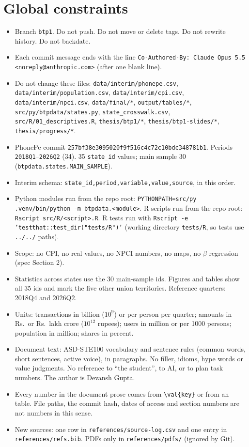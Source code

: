 \documentclass[10pt,a4paper]{article}
\newcommand{\f}[1]{\texttt{#1}}
\begin{document}
\section*{Global constraints}
\begin{itemize}
\item Branch \f{btp1}. Do not push. Do not move or delete tags. Do not rewrite history. Do not backdate.
\item Each commit message ends with the line \f{Co-Authored-By: Claude Opus 5.5 <noreply@anthropic.com>}
      (after one blank line).
\item Do not change these files: \f{data/interim/phonepe.csv}, \f{data/interim/population.csv},
      \f{data/interim/cpi.csv}, \f{data/interim/npci.csv}, \f{data/final/*}, \f{output/tables/*},
      \f{src/py/btpdata/states.py}, \f{state\_crosswalk.csv}, \f{src/R/01\_descriptives.R},
      \f{thesis/btp1/*}, \f{thesis/btp1-slides/*}, \f{thesis/progress/*}.
\item PhonePe commit \f{257bf38e3095020f9f516c4c72c10bdc348781b1}. Periods \f{2018Q1}--\f{2026Q2} (34).
      35 \f{state\_id} values; main sample 30 (\f{btpdata.states.MAIN\_SAMPLE}).
\item Interim schema: \f{state\_id,period,variable,value,source}, in this order.
\item Python modules run from the repo root: \f{PYTHONPATH=src/py .venv/bin/python -m btpdata.<module>}.
      R scripts run from the repo root: \f{Rscript src/R/<script>.R}. R tests run with
      \f{Rscript -e 'testthat::test\_dir("tests/R")'} (working directory \f{tests/R}, so tests use
      \f{../../} paths).
\item Scope: no CPI, no real values, no NPCI numbers, no maps, no $\beta$-regression (spec Section 2).
\item Statistics across states use the 30 main-sample ids. Figures and tables show all 35 ids and mark the
      five other union territories. Reference quarters: 2018Q4 and 2026Q2.
\item Units: transactions in billion ($10^9$) or per person per quarter; amounts in Rs.\ or Rs.\ lakh crore
      ($10^{12}$ rupees); users in million or per 1000 persons; population in million; shares in percent.
\item Document text: ASD-STE100 vocabulary and sentence rules (common words, short sentences, active voice),
      in paragraphs. No filler, idioms, hype words or value judgments. No reference to ``the student'', to
      AI, or to plan task numbers. The author is Devansh Gupta.
\item Every number in the document prose comes from \verb|\val{key}| or from an \verb|| table. File
      paths, the commit hash, dates of access and section numbers are not numbers in this sense.
\item New sources: one row in \f{references/source-log.csv} and one entry in \f{references/refs.bib}. PDFs
      only in \f{references/pdfs/} (ignored by Git).
\end{itemize}
\end{document}
